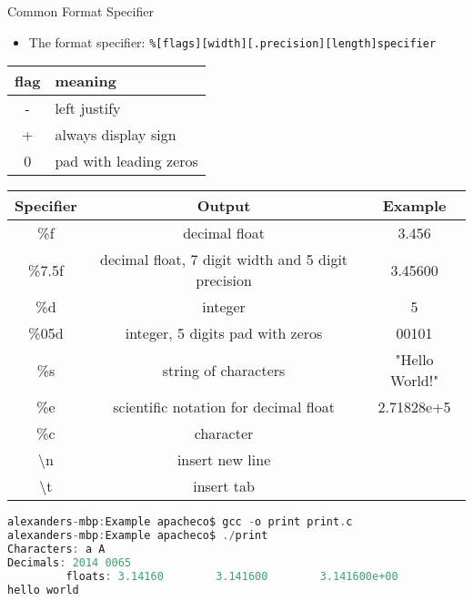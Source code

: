 \documentclass[10pt,t]{beamer}
\begin{document}
\begin{frame}[fragile]{Common Format Specifier}
  \begin{itemize}
    \item The format specifier: \lstinline|%[flags][width][.precision][length]specifier| 
  \end{itemize}
  \begin{center}
    \begin{tabular}{cl}
      \hline
      flag & meaning \\
      \hline
      - & left justify \\
      + & always display sign\\
      0 & pad with leading zeros\\
      \hline
    \end{tabular}
  \end{center}
  \begin{center}
    \begin{tabular}{|c|c|c|}
      \hline
      Specifier & Output & Example\\
      \hline
      \%f & decimal float & 3.456 \\
      \hline
      \%7.5f & decimal float, 7 digit width and 5 digit precision & 3.45600 \\
      \hline
      \%d & integer & 5\\
      \hline
      \%05d & integer, 5 digits pad with zeros & 00101 \\
      \hline
      \%s & string of characters & "Hello World!"\\
      \hline
      \%e & scientific notation for decimal float & 2.71828e+5  \\
      \hline
      \%c & character &  \\
      \hline
      \textbackslash{}n & insert new line & \\
      \hline
      \textbackslash{}t & insert tab & \\
      \hline
    \end{tabular}
  \end{center}
\end{frame}

\begin{frame}[fragile]{}
  

  \begin{lstlisting}[language=C]
alexanders-mbp:Example apacheco$ gcc -o print print.c
alexanders-mbp:Example apacheco$ ./print
Characters: a A 
Decimals: 2014 0065
         floats: 3.14160        3.141600        3.141600e+00 
hello world 

  \end{lstlisting}
\end{frame}
\end{document}
